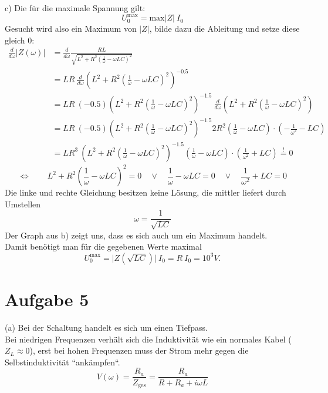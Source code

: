 \documentclass[11pt a4paper]{article}
\begin{document}
c) Die für die maximale Spannung gilt:
\[ U_0^\text{max} = \text{max}\vert Z \vert \ I_0 \]
Gesucht wird also ein Maximum von $\vert Z \vert$, bilde dazu die Ableitung und setze diese gleich 0:
\begin{align*}
	\frac{d}{d\omega} \vert Z(\omega) \vert 
	&= \frac{d}{d\omega} \frac{RL}{\sqrt{L^2 + R^2  \left(\frac1\omega - \omega LC \right)^2}} \\
	&= LR \ \frac{d}{d\omega} \left(L^2 + R^2  \left(\frac1\omega - \omega LC \right)^2 \right)^{-0.5} \\
	&= LR \ (-0.5) \left(L^2 + R^2  \left(\frac1\omega - \omega LC \right)^2 \right)^{-1.5}
		\ \frac{d}{d\omega} \left(L^2 + R^2  \left(\frac1\omega - \omega LC \right)^2 \right) \\
	&= LR \ (-0.5) \left(L^2 + R^2  \left(\frac1\omega - \omega LC \right)^2 \right)^{-1.5}
		2R^2  \left(\frac1\omega - \omega LC \right) \cdot \left(-\frac{1}{\omega^2} - LC \right) \\
	&= LR^3 \ \left(L^2 + R^2  \left(\frac1\omega - \omega LC \right)^2 \right)^{-1.5}
		\left(\frac1\omega - \omega LC \right) \cdot \left(\frac{1}{\omega^2} + LC \right) 
	\overset != 0
\end{align*}
\[
\Leftrightarrow \qquad
	L^2 + R^2  \left(\frac1\omega - \omega LC \right)^2 = 0 \quad \lor \quad
	\frac1\omega - \omega LC = 0 \quad \lor \quad
	\frac{1}{\omega^2} + LC = 0
\]
Die linke und rechte Gleichung besitzen keine Lösung, die mittler liefert durch Umstellen
\[ \omega = \frac 1 {\sqrt{LC}} \]
Der Graph aus b) zeigt uns, dass es sich auch um ein Maximum handelt. \\
Damit benötigt man für die gegebenen Werte maximal
\[ U_0^\text{max} =  \vert Z\left(\sqrt{LC}\right) \vert \ I_0 = R \ I_0 = 10^3 V. \]

\newpage

\section*{Aufgabe 5}

\quad (a) Bei der Schaltung handelt es sich um einen Tiefpass. \\
Bei niedrigen Frequenzen verhält sich die Induktivität 
wie ein normales Kabel ($Z_L \approx 0$), erst bei hohen Frequenzen muss der Strom mehr gegen die 
Selbstinduktivität ``ankämpfen``.
\[ V(\omega) = \frac{R_a}{Z_\text{ges}} = \frac{R_a}{R + R_a + i\omega L} \]
\\
\end{document}
